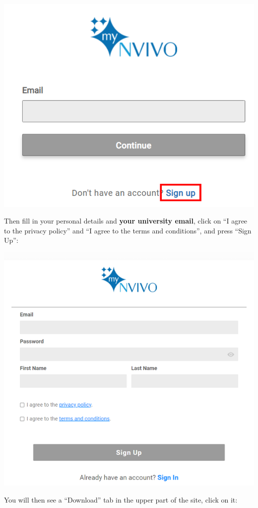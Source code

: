 \documentclass[
]{book}
\begin{document}
\includegraphics{imgs/nvivo_signup.png}

Then fill in your personal details and \textbf{your university email}, click on ``I agree to the privacy policy'' and ``I agree to the terms and conditions'', and press ``Sign Up'':

\includegraphics{imgs/nvivo_register.png}

You will then see a ``Download'' tab in the upper part of the site, click on it:
\end{document}
